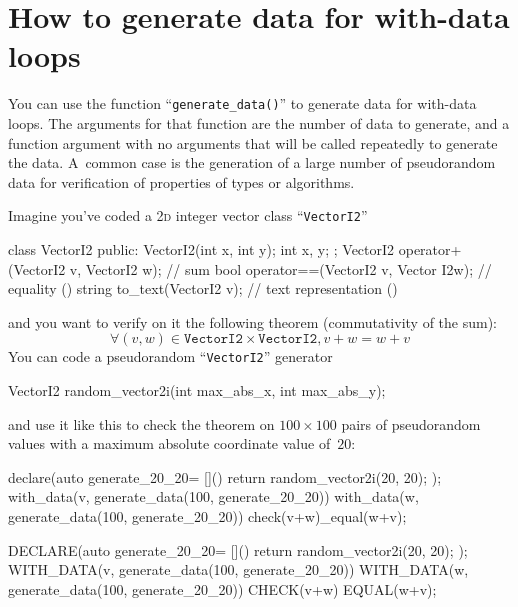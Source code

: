 \documentclass[twoside, a4paper, article]{memoir}
\begin{document}
\section{How to generate data for with-data loops}
\label{sec:generate-data-with-data-loops}

You can use the function ``\texttt{generate\_data()}'' to generate data for
with-data loops.  The arguments for that function are the number of data to
generate, and a function argument with no arguments that will be called
repeatedly to generate the data.  A~common case is the generation of a large
number of pseudorandom data for verification of properties of types or
algorithms.

Imagine you've coded a \textsc{2d} integer vector class ``\texttt{VectorI2}''
\begin{cpplisting}
class VectorI2 {
public:
  VectorI2(int x, int y);
  int x, y;
};
VectorI2 operator+(VectorI2 v, VectorI2 w); // sum
bool operator==(VectorI2 v, Vector I2w); // equality ()
string to_text(VectorI2 v); // text representation %
                               ()
\end{cpplisting}
and you want to verify on it the following theorem (commutativity of the sum):
\begin{equation}
  \label{eq:1}
  \forall (v, w) \in \texttt{VectorI2} \times \texttt{VectorI2}, v + w = w + v
\end{equation}
You can code a pseudorandom ``\texttt{VectorI2}'' generator
\begin{cpplisting}
VectorI2 random_vector2i(int max_abs_x, int max_abs_y);
\end{cpplisting}
and use it like this to check the theorem on $100 \times 100$ pairs of
pseudorandom values with a maximum absolute coordinate value of~$20$:
\begin{cpplisting}
declare(auto generate_20_20=
        []() { return random_vector2i(20, 20); });
with_data(v, generate_data(100, generate_20_20))
  with_data(w, generate_data(100, generate_20_20))
    check(v+w)_equal(w+v);
\end{cpplisting}

\begin{cpplisting}
DECLARE(auto generate_20_20=
        []() { return random_vector2i(20, 20); });
WITH_DATA(v, generate_data(100, generate_20_20))
  WITH_DATA(w, generate_data(100, generate_20_20))
    CHECK(v+w) EQUAL(w+v);
\end{cpplisting}
\end{document}
